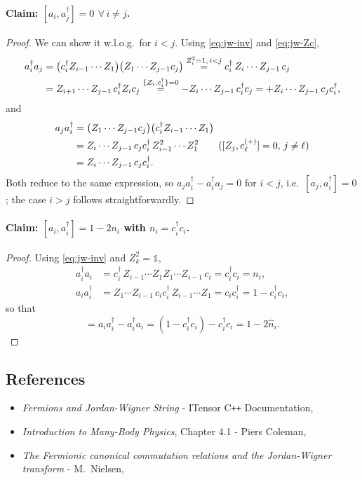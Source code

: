 \documentclass[../../main.tex]{subfiles}
\begin{document}
\paragraph{Claim: $[a_i,a_j^\dagger]=0\ \, \forall\,i\neq j$.}
\begin{proof}
We can show it w.l.o.g.\ for $i<j$. Using \cref{eq:jw-inv} and \cref{eq:jw-Zc},
\begin{align}
a_i^\dagger a_j&=\bigl(c_i^\dagger Z_{i-1}\cdots Z_1\bigr)\bigl(Z_1\cdots Z_{j-1}c_j\bigr)
\overset{Z_i^2=1,\,i<j}{=}c_i^\dagger\,Z_i\cdots Z_{j-1}\,c_j\notag\\
&=Z_{i+1}\cdots Z_{j-1}\,c_i^\dagger Z_i c_j
\overset{\{Z_i,c_i^\dagger\}=0}{=}-Z_i\cdots Z_{j-1}\,c_i^\dagger c_j
=+Z_i\cdots Z_{j-1}\,c_j c_i^\dagger,
\end{align}
and
\begin{align}
a_j a_i^\dagger &= \bigl(Z_1\cdots Z_{j-1}c_j\bigr)\bigl(c_i^\dagger Z_{i-1}\cdots Z_1\bigr) \notag \\
&= Z_i\cdots Z_{j-1}\,c_j c_i^\dagger\,Z_{i-1}^2\cdots Z_1^2 \qquad ([Z_j,c_\ell^{(+)}]=0,\,j\neq\ell) \notag \\
&=Z_i\cdots Z_{j-1}\,c_j c_i^\dagger .
\end{align}
Both reduce to the same expression, so $a_j a_i^\dagger-a_i^\dagger a_j=0$ for $i<j$, i.e.\
$[a_j,a_i^\dagger]=0$; the case $i>j$ follows straightforwardly.
\end{proof}

\paragraph{Claim: $[a_i,a_i^\dagger]=1-2n_i$ with $n_i=c_i^\dagger c_i$.}
\begin{proof}
Using \cref{eq:jw-inv} and $Z_k^2=\mathds 1$,
\begin{align}
a_i^\dagger a_i&=c_i^\dagger\,Z_{i-1}\cdots Z_1 Z_1\cdots Z_{i-1}\,c_i=c_i^\dagger c_i=n_i,\\
a_i a_i^\dagger&=Z_1\cdots Z_{i-1}\,c_i c_i^\dagger\,Z_{i-1}\cdots Z_1=c_i c_i^\dagger=1-c_i^\dagger c_i,
\end{align}
so that
\begin{equation}
[\hat a_i,\hat a_i^\dagger]=a_i a_i^\dagger-a_i^\dagger a_i=(1-c_i^\dagger c_i)-c_i^\dagger c_i
=1-2\hat n_i.
\end{equation}
\end{proof}

\subsection{References}

\begin{itemize}
\item \emph{Fermions and Jordan-Wigner String} - ITensor C\texttt{++} Documentation,
\item \emph{Introduction to Many-Body Physics}, Chapter 4.1 - Piers Coleman,
\item \emph{The Fermionic canonical commutation relations and the Jordan-Wigner transform}
      - M.\ Nielsen,
\end{itemize}
\end{document}
